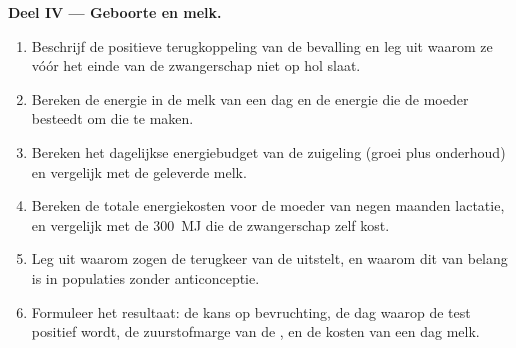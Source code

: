 \begin{problem}
\medskip
\noindent\textbf{Deel IV --- Geboorte en melk.}
\begin{enumerate}[resume]
  \item Beschrijf de positieve terugkoppeling van de bevalling en leg uit
        waarom ze vóór het einde van de zwangerschap niet op hol slaat.
  \item Bereken de energie in de melk van een dag en de energie die de
        moeder besteedt om die te maken.
  \item Bereken het dagelijkse energiebudget van de zuigeling (groei plus
        onderhoud) en vergelijk met de geleverde melk.
  \item Bereken de totale energiekosten voor de moeder van negen maanden
        lactatie, en vergelijk met de \qty{300}{MJ} die de zwangerschap zelf
        kost.
  \item Leg uit waarom zogen de terugkeer van de  uitstelt, en
        waarom dit van belang is in populaties zonder anticonceptie.
  \item Formuleer het resultaat: de kans op bevruchting, de dag waarop de
        test positief wordt, de zuurstofmarge van de , en de
        kosten van een dag melk.
\end{enumerate}
\end{problem}
